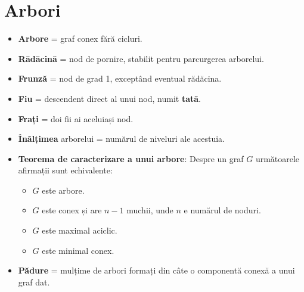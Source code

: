 \documentclass{article}
\begin{document}
\section*{Arbori}
\begin{itemize}
    \item \textbf{Arbore} = graf conex fără cicluri.
    \item \textbf{Rădăcină} = nod de pornire, stabilit pentru parcurgerea arborelui.
    \item \textbf{Frunză} = nod de grad 1, exceptând eventual rădăcina.
    \item \textbf{Fiu} = descendent direct al unui nod, numit \textbf{tată}.
    \item \textbf{Frați} = doi fii ai aceluiași nod.
    \item \textbf{Înălțimea} arborelui = numărul de niveluri ale acestuia.
    \item \textbf{Teorema de caracterizare a unui arbore}: Despre un graf $G$ următoarele afirmații sunt echivalente:
    \begin{itemize}
        \item $G$ este arbore.
        \item $G$ este conex și are $n-1$ muchii, unde $n$ e numărul de noduri.
        \item $G$ este maximal aciclic.
        \item $G$ este minimal conex.
    \end{itemize}
    \item \textbf{Pădure} = mulțime de arbori formați din câte o componentă conexă a unui graf dat.
\end{itemize}
\end{document}
